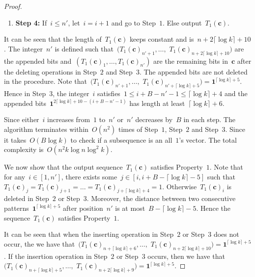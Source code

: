 \documentclass[10pt,a4paper,onecolumn]{IEEEtran}
\newcommand{\1}{\mathbbold{1}}
\newcommand{\boldc}{\mathbf{c}}
\begin{document}
\begin{proof}
\begin{enumerate}
    $\boldsymbol{1}^{2\lceil \log k\rceil+10-(i+B-n'-1)},0)$ to the end of~$T_1(\boldc)$. 
    Let~$n'=i-1$ and~$i=1$. Go to Step~$1$.
    \item \textbf{Step 4:}
    If~$i\le n'$, let~$i=i+1$ and go to Step~$1$.
    Else output~$T_1(\boldc)$. 
\end{enumerate}
It can be seen that the length of~$T_1(\boldc)$ keeps constant and is~$n+2\lceil \log k\rceil+10$.
The integer~$n'$ is defined such that~$(T_1(\boldc)_{n'+1},\ldots,$ $ T_1(\boldc)_{n+2\lceil \log k\rceil+10})$ are the appended bits and~$(T_1(\boldc)_{1},\ldots,T_1(\boldc)_{n'})$ are the remaining bits in~$\boldc$ after the deleting operations in Step~$2$ and Step~$3$. The appended bits are not deleted in the procedure. Note that~$(T_1(\boldc)_{n'+1},\ldots,$ $ T_1(\boldc)_{n'+\lceil \log k\rceil+5})=\boldsymbol{1}^{\lceil \log k\rceil+5}$. Hence in Step~$3$, the integer~$i$ satisfies~$1\le i+B-n'-1\le \lceil \log k\rceil+4$ and the appended bits~$\boldsymbol{1}^{2\lceil \log k\rceil+10-(i+B-n'-1)}$ has length at least~$\lceil \log k\rceil+6$.

Since either~$i$ increases from~$1$ to~$n'$ or~$n'$ decreases by~$B$ in each step.  The algorithm terminates within~$O(n^2)$ times of Step~$1$, Step~$2$ and Step~$3$. Since it takes~$O(B\log k)$ to check if a subsequence is an all~$1$'s vector. The total complexity is~$O(n^2k\log n\log^2 k)$.


We now show that the output sequence~$T_1(\boldc)$ satisfies Property~$1$.
Note that for any~$i\in [1,n']$, there exists some~$j\in [i,i+B-\lceil \log k\rceil-5]$ such that~$T_1(\boldc)_{j}=T_1(\boldc)_{j+1}=\ldots=T_1(\boldc)_{j+\lceil \log k \rceil+4}=1$. Otherwise~$T_1(\boldc)_i$ is deleted in Step~$2$ or Step~$3$. 
Moreover, the distance between two consecutive patterns~$\boldsymbol{1}^{\lceil \log k\rceil+5}$ after position~$n'$ is at most~$B-\lceil \log k\rceil-5$.   
Hence the sequence~$T_1(\boldc)$ satisfies Property~$1$. 

It can be seen that when the inserting operation in Step~$2$ or Step~$3$ does not occur, the we have that~$(T_1(\boldc)_{n+\lceil \log k\rceil+6},\ldots,$ $T_1(\boldc)_{n+2\lceil \log k\rceil+10})=\boldsymbol{1}^{\lceil \log k\rceil+5}$. If the insertion operation in Step~$2$ or Step~$3$ occurs, then we have that~$(T_1(\boldc)_{n+\lceil \log k\rceil+5},\ldots,$ $T_1(\boldc)_{n+2\lceil \log k\rceil+9})=\boldsymbol{1}^{\lceil \log k\rceil+5}$.


\end{proof}
\end{document}
